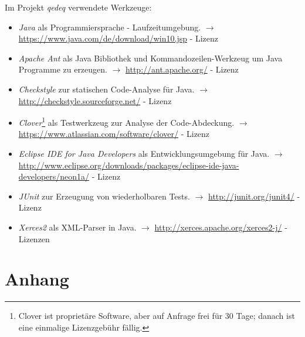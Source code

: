 \documentclass[english,ngerman,parskip=half,headsepline,footsepline]{scrreprt}
\newcounter{Enumi}
\begin{document}
	Im Projekt \emph{qedeq} verwendete Werkzeuge:
	\begin{itemize}
		\setcounter{enumi}{\value{Enumi}}
		
		\item\label{Werkzeug:Java}\emph{Java} als Programmiersprache - Laufzeitumgebung. $\rightarrow$ \url{https://www.java.com/de/download/win10.jsp} - Lizenz \cite{JavaSE}
		
		\item\label{Werkzeug:ApacheAnt}\emph{Apache Ant} als Java Bibliothek und Kommandozeilen-Werkzeug um Java Programme zu erzeugen. $\rightarrow$ \url{http://ant.apache.org/} - Lizenz \cite{Apacheii}
		
		\item\label{Werkzeug:Checkstyle}\emph{Checkstyle} zur statischen Code-Analyse für Java. $\rightarrow$ \url{http://checkstyle.sourceforge.net/} - Lizenz \cite{LGPLii}
		
		\item\label{Werkzeug:Clover}\emph{Clover}\footnote{ Clover ist proprietäre Software, aber auf Anfrage frei für 30 Tage; danach ist eine einmalige Lizenzgebühr fällig.} als Testwerkzeug zur Analyse der Code-Abdeckung. $\rightarrow$ \url{https://www.atlassian.com/software/clover/} - Lizenz \cite{Clover}
		
		\item\label{Werkzeug:EclipseCpp}\emph{Eclipse IDE for Java Developers} als Entwicklungsumgebung für Java. $\rightarrow$ \url{http://www.eclipse.org/downloads/packages/eclipse-ide-java-developers/neon1a/} - Lizenz \cite{OSI}
		
		\item\label{Werkzeug:JUnit}\emph{JUnit} zur Erzeugung von wiederholbaren Tests. $\rightarrow$ \url{http://junit.org/junit4/} - Lizenz \cite{EPL}
		
		\item\label{Werkzeug:Xerces2}\emph{Xerces2} als XML-Parser in Java. $\rightarrow$ \url{http://xerces.apache.org/xerces2-j/} - Lizenzen \cite{Apacheii,SAX,WDCDL,WDCSNL}
		
		\setcounter{Enumi}{\value{enumi}}
	\end{itemize}
	

	\appendix
	
	\chapter{Anhang}
	\thispagestyle{scrheadings}
	
\end{document}
